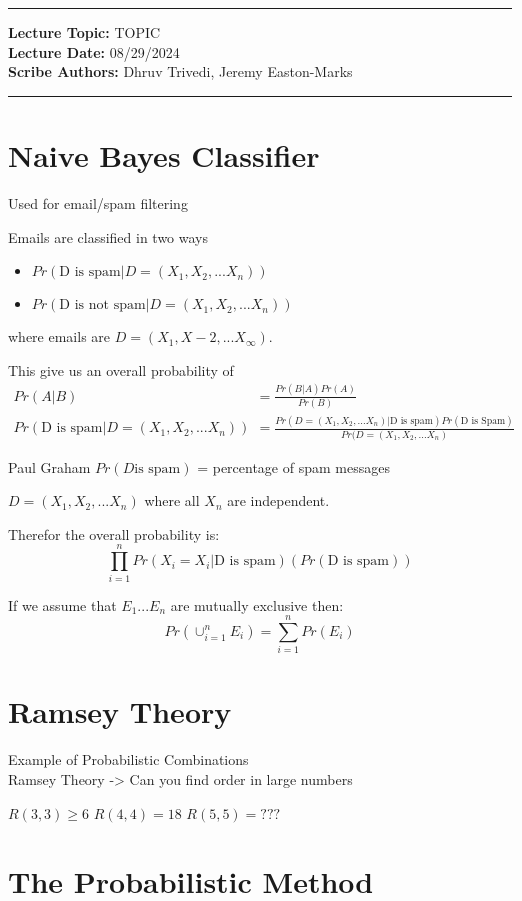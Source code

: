 \hrule
\vspace{0.1in}
\noindent
\textbf{Lecture Topic: } TOPIC\\
\textbf{Lecture Date: } 08/29/2024 \\
\textbf{Scribe Authors: }Dhruv Trivedi, Jeremy Easton-Marks
\vspace{0.1in}
\hrule
\vspace{0.1in}

\section*{Naive Bayes Classifier}
Used for email/spam filtering

Emails are classified in two ways
\begin{itemize}
    \item $Pr(\text{D  is spam} | D = (X_1,X_2,...X_n)) $
    \item $ Pr(\text{D is not spam} | D = (X_1,X_2,...X_n)) $
\end{itemize}
where emails are $D = (X_1, X-2,... X_\infty)$.

This give us an overall probability of
\[
\begin{aligned}
Pr(A | B) & = \frac{Pr(B | A) Pr(A)}{Pr(B)} \\
Pr(\text{D is spam} | D = (X_1,X_2,...X_n)) & = \frac{Pr(D = (X_1,X_2,...X_n) | \text{D is spam})Pr(\text{D is Spam})}{Pr(D = (X_1,X_2,...X_n)}
\end{aligned}
\]


Paul Graham
$Pr(D \text{is spam})$ = percentage of spam messages

$D=(X_1,X_2,...X_n)$ where all $X_n$ are independent.

Therefor the overall probability is:
\[
\prod_{i = 1}^{n} Pr(X_i = X_i | \text{D is spam})(Pr(\text{D is spam}))
\]

If we assume that $E_1...E_n$ are mutually exclusive then:
\[
Pr(\cup_{i=1}^{n} E_i) = \sum_{i=1}^{n} Pr(E_i)
\]

\section*{Ramsey Theory}
Example of Probabilistic Combinations \\
Ramsey Theory -> Can you find order in large numbers

$R(3,3) \geq 6$
$R(4, 4) = 18$
$R(5, 5) = ???$

\section*{The Probabilistic Method}


